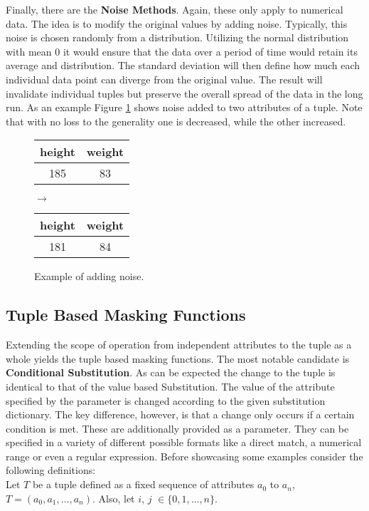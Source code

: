 Finally, there are the \textbf{Noise Methods}. Again, these only apply to numerical data. The idea is to modify the original values by adding noise. Typically, this noise is chosen randomly from a distribution. Utilizing the normal distribution with mean 0 it would ensure that the data over a period of time would retain its average and distribution. The standard deviation will then define how much each individual data point can diverge from the original value. The result will invalidate individual tuples but preserve the overall spread of the data in the long run. As an example Figure \ref{fig:noise} shows noise added to two attributes of a tuple. Note that with no loss to the generality one is decreased, while the other increased. 

\bigskip

\begin{figure}[ht]
    \begin{center}
    \footnotesize{
        \renewcommand{\arraystretch}{1.5}
        \begin{tabular}{|c|c|}
            \hline
            height & weight \\
            \hline
            185 & 83 \\
            \hline
            \end{tabular}
            \quad $\longrightarrow$ \quad
            \begin{tabular}{|c|c|}
            \hline
            height & weight  \\
            \hline
            181 & 84\\
            \hline
        \end{tabular}
    }
    \end{center}
    \caption{Example of adding noise.\label{fig:noise}}
\end{figure}

\subsection{Tuple Based Masking Functions}
Extending the scope of operation from independent attributes to the tuple as a whole yields the tuple based masking functions. The most notable candidate is \textbf{Conditional Substitution}. As can be expected the change to the tuple is identical to that of the value based Substitution. The value of the attribute specified by the parameter is changed according to the given substitution dictionary. The key difference, however, is that a change only occurs if a certain condition is met. These are additionally provided as a parameter. They can be specified in a variety of different possible formats like a direct match, a numerical range or even a regular expression. Before showcasing some examples consider the following definitions: \newline
\\
Let $T$ be a tuple defined as a fixed sequence of attributes $a_0$ to $a_n$, $T = (a_0, a_1, \dots, a_n)$. Also, let $i$, $j$ $\in \{0,1, \dots, n\}$. \\

